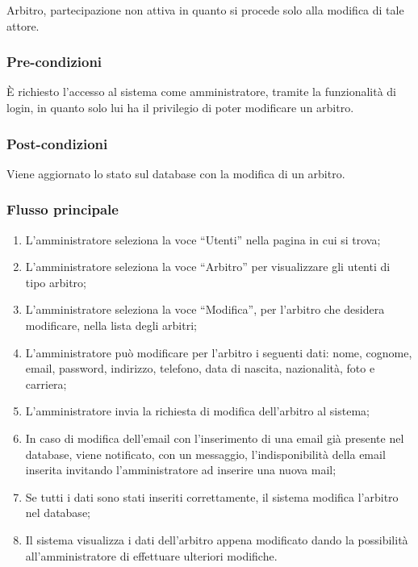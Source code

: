 Arbitro, partecipazione non attiva in quanto si procede solo alla modifica di tale attore.

\subsubsection*{Pre-condizioni}
È richiesto l'accesso al sistema come amministratore, tramite la funzionalità di login, in quanto solo lui ha il privilegio di poter modificare un arbitro.

\subsubsection*{Post-condizioni}
Viene aggiornato lo stato sul database con la modifica di un arbitro.

\subsubsection*{Flusso principale}

\begin{enumerate}
	
	\item
	L'amministratore seleziona la voce ``Utenti'' nella pagina in cui si trova;
	
	\item
	L'amministratore seleziona la voce ``Arbitro'' per visualizzare gli utenti di tipo arbitro;
	
	\item
	L'amministratore seleziona la voce ``Modifica'', per l'arbitro che desidera modificare, nella lista degli arbitri;
	
	\item
	L'amministratore può modificare per l'arbitro i seguenti dati: nome, cognome, email, password, indirizzo, telefono, data di nascita, nazionalità, foto e carriera;
	
	\item
	L'amministratore invia la richiesta di modifica dell'arbitro al sistema;
	
	\item
	In caso di modifica dell'email con l'inserimento di una email già presente nel database, viene notificato, con un messaggio, l'indisponibilità della email inserita invitando l'amministratore ad inserire una nuova mail;
	
	\item
	Se tutti i dati sono stati inseriti correttamente, il sistema modifica l'arbitro nel database;
	
	\item
	Il sistema visualizza i dati dell'arbitro appena modificato dando la possibilità all'amministratore di effettuare ulteriori modifiche.
	
\end{enumerate}

